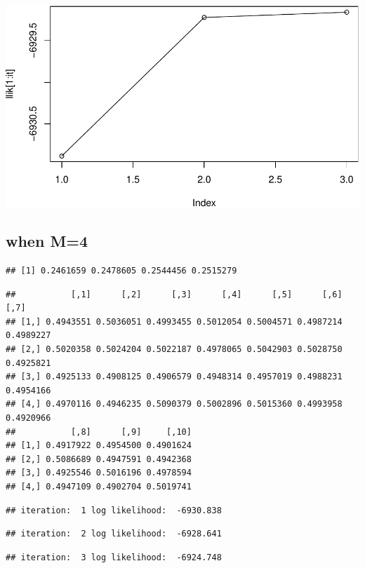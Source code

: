 \documentclass[
]{article}
\begin{document}
\includegraphics{MLLab1block2-lepeng_files/figure-latex/Assignment2_6-1.pdf}

\hypertarget{when-m4}{%
\subsection{when M=4}\label{when-m4}}

\begin{verbatim}
## [1] 0.2461659 0.2478605 0.2544456 0.2515279
\end{verbatim}

\begin{verbatim}
##           [,1]      [,2]      [,3]      [,4]      [,5]      [,6]      [,7]
## [1,] 0.4943551 0.5036051 0.4993455 0.5012054 0.5004571 0.4987214 0.4989227
## [2,] 0.5020358 0.5024204 0.5022187 0.4978065 0.5042903 0.5028750 0.4925821
## [3,] 0.4925133 0.4908125 0.4906579 0.4948314 0.4957019 0.4988231 0.4954166
## [4,] 0.4970116 0.4946235 0.5090379 0.5002896 0.5015360 0.4993958 0.4920966
##           [,8]      [,9]     [,10]
## [1,] 0.4917922 0.4954500 0.4901624
## [2,] 0.5086689 0.4947591 0.4942368
## [3,] 0.4925546 0.5016196 0.4978594
## [4,] 0.4947109 0.4902704 0.5019741
\end{verbatim}

\begin{verbatim}
## iteration:  1 log likelihood:  -6930.838
\end{verbatim}

\begin{verbatim}
## iteration:  2 log likelihood:  -6928.641
\end{verbatim}

\begin{verbatim}
## iteration:  3 log likelihood:  -6924.748
\end{verbatim}
\end{document}
